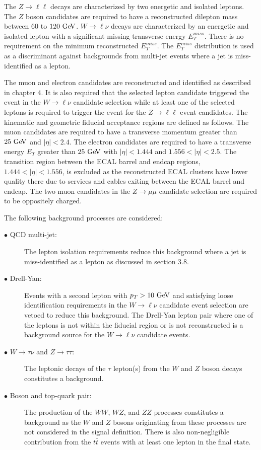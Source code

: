 The $Z \rightarrow \ell\ell$ decays are characterized by two energetic and isolated leptons. The $Z$ boson candidates are required to have a reconstructed dilepton mass between $60$ to $120~\mathrm{Ge\kern -0.1em V}$. $W \rightarrow \ell \nu$ decays are characterized by an energetic and isolated lepton with a significant missing transverse energy $E_{T}^{miss}$. There is no requirement on the minimum reconstructed $E_{T}^{miss}$. The $E_{T}^{miss}$ distribution is used as a discriminant against backgrounds from multi-jet events where a jet is miss-identified as a lepton.

The muon and electron candidates are reconstructed and identified as described in chapter 4. It is also required that the selected lepton candidate triggered the event in the $W\rightarrow \ell\nu$ candidate selection while at least one of the selected leptons is required to trigger the event for the $Z\rightarrow \ell\ell$ event candidates. The kinematic and geometric fiducial acceptance regions are defined as follows. The muon candidates are required to have a transverse momentum greater than $25~\mathrm{Ge\kern -0.1em V}$ and $|\eta|<2.4$. The electron candidates are required to have a transverse energy $E_{T}$ greater than $25~\mathrm{Ge\kern -0.1em V}$ with $|\eta|<1.444$ and $1.556<|\eta|<2.5$.  The transition region between the ECAL barrel and endcap regions, $1.444<|\eta|<1.556$, is excluded as the reconstructed ECAL clusters have lower quality there due to services and cables exiting between the ECAL barrel and endcap. The two muon candidates in the  $Z\rightarrow \mu\mu$ candidate selection are required to be oppositely charged.

The following background processes are considered:
\begin{description}
\item[$\bullet$ QCD multi-jet:] The lepton isolation requirements reduce this background where a jet is miss-identified as a lepton as discussed in section 3.8.  
\item[$\bullet$ Drell-Yan:] Events with a second lepton with $p_{T}>10~\mathrm{Ge\kern -0.1em V}$ and satisfying loose identification requirements in the $W \rightarrow \ell\nu$ candidate event selection are vetoed to reduce this background. The Drell-Yan lepton pair where one of the leptons is not within the fiducial region or is not reconstructed is a background source for the $W \rightarrow \ell\nu$ candidate events. 
\item[$\bullet$ $W\rightarrow \tau\nu$ and $Z\rightarrow \tau\tau$:] The leptonic decays of the $\tau$ lepton(s) from the $W$ and $Z$ boson decays constitutes a background. 
\item[$\bullet$ Boson and top-quark pair:] The production of the $WW$, $WZ$, and $ZZ$ processes constitutes a background as the $W$ and $Z$ bosons originating from these processes are not considered in the signal definition. There is also non-negligible contribution from the $t\bar{t}$ events with at least one lepton in the final state.
\end{description}    

